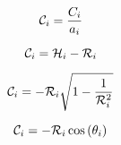 \begin{equation}
\C_{i}=\frac{C_{i}}{a_{i}}
\end{equation}

\begin{equation}
\C_{i}=\h_{i}-\R_{i}
\end{equation}

\begin{equation}
\C_{i}=-\R_{i}\sqrt{1-\frac{1}{\R_{i}^{2}}}
\end{equation}

\begin{equation}
\C_{i}=-\R_{i}\cos\left(\theta_{i}\right)
\end{equation}


